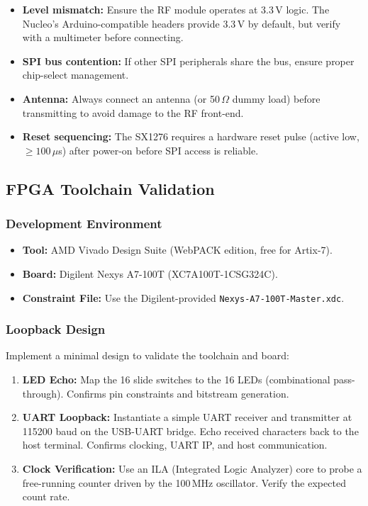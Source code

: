 \documentclass[11pt,letterpaper]{article}
\begin{document}
	\begin{tcolorbox}[warning={Common Pitfalls}]
		\begin{itemize}
			\item \textbf{Level mismatch:} Ensure the RF module operates at 3.3\,V logic. The Nucleo's Arduino-compatible headers provide 3.3\,V by default, but verify with a multimeter before connecting.
			\item \textbf{SPI bus contention:} If other SPI peripherals share the bus, ensure proper chip-select management.
			\item \textbf{Antenna:} Always connect an antenna (or 50\,$\Omega$ dummy load) before transmitting to avoid damage to the RF front-end.
			\item \textbf{Reset sequencing:} The SX1276 requires a hardware reset pulse (active low, $\geq 100$\,$\mu$s) after power-on before SPI access is reliable.
		\end{itemize}
	\end{tcolorbox}
	
	\subsection{FPGA Toolchain Validation}
	
	\subsubsection{Development Environment}
	
	\begin{itemize}[leftmargin=2em]
		\item \textbf{Tool:} AMD Vivado Design Suite (WebPACK edition, free for Artix-7).
		\item \textbf{Board:} Digilent Nexys A7-100T (XC7A100T-1CSG324C).
		\item \textbf{Constraint File:} Use the Digilent-provided \texttt{Nexys-A7-100T-Master.xdc}.
	\end{itemize}
	
	\subsubsection{Loopback Design}
	
	Implement a minimal design to validate the toolchain and board:
	
	\begin{enumerate}[leftmargin=2em]
		\item \textbf{LED Echo:} Map the 16 slide switches to the 16 LEDs (combinational pass-through). Confirms pin constraints and bitstream generation.
		\item \textbf{UART Loopback:} Instantiate a simple UART receiver and transmitter at 115200 baud on the USB-UART bridge. Echo received characters back to the host terminal. Confirms clocking, UART IP, and host communication.
		\item \textbf{Clock Verification:} Use an ILA (Integrated Logic Analyzer) core to probe a free-running counter driven by the 100\,MHz oscillator. Verify the expected count rate.
	\end{enumerate}
	
\end{document}
